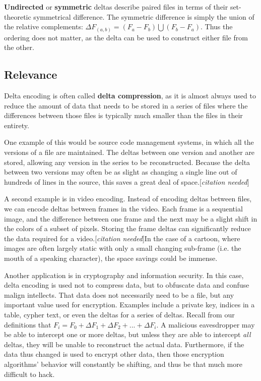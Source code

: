 \documentclass[12pt,a4paper]{article}
\newcommand{\citationNeeded}{[\textit{citation needed}]}
\begin{document}
		\textbf{Undirected} or \textbf{symmetric} deltas describe paired files in terms of their set-theoretic symmetrical difference. The symmetric difference is simply the union of the relative complements: $\Delta F_{(a,b)} = (F_a - F_b) \bigcup (F_b - F_a)$. Thus the ordering does not matter, as the delta can be used to construct either file from the other.
		
		\subsection{Relevance}
		
		Delta encoding is often called \textbf{delta compression}, as it is almost always used to reduce the amount of data that needs to be stored in a series of files where the differences between those files is typically much smaller than the files in their entirety.
		
		One example of this would be source code management systems, in which all the versions of a file are maintained. The deltas between one version and another are stored, allowing any version in the series to be reconstructed. Because the delta between two versions may often be as slight as changing a single line out of hundreds of lines in the source, this saves a great deal of space.\citationNeeded
		
		A second example is in video encoding. Instead of encoding deltas between files, we can encode deltas between frames in the video. Each frame is a sequential image, and the difference between one frame and the next may be a slight shift in the colors of a subset of pixels. Storing the frame deltas can significantly reduce the data required for a video.\citationNeeded In the case of a cartoon, where images are often largely static with only a small changing sub-frame (i.e. the mouth of a speaking character), the space savings could be immense.
		
		Another application is in cryptography and information security. In this case, delta encoding is used not to compress data, but to obfuscate data and confuse malign intellects. That data does not necessarily need to be a file, but any important value used for encryption. Examples include a private key, indices in a table, cypher text, or even the deltas for a series of deltas.\cite{Crypto} Recall from our definitions that $F_i = F_0 + \Delta F_1 + \Delta F_2 + ... + \Delta F_i$. A malicious eavesdropper may be able to intercept one or more deltas, but unless they are able to intercept \textit{all} deltas, they will be unable to reconstruct the actual data. Furthermore, if the data thus changed is used to encrypt other data, then those encryption algorithms' behavior will constantly be shifting, and thus be that much more difficult to hack.
		
\end{document}
